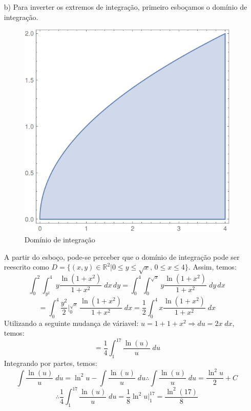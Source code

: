 \documentclass[12pt,a4paper]{article}
\begin{document}
\begin{itemize}
\item[b)] Para inverter os extremos de integração, primeiro esboçamos o domínio de integração.
\begin{figure}[H]
	\centering
	\includegraphics[scale=0.25]{Fig2b.png}  
	\caption{Domínio de integração}
	\label{fig:figura2bB}
\end{figure}
A partir do esboço, pode-se perceber que o domínio de integração pode ser reescrito como $D= \{(x,y)\in \mathbb{R}^2 | 0 \leq y \leq \sqrt{x}, \, 0 \leq x \leq 4\}$. Assim, temos:
$$ \int_0^2 \int_{y^2}^4 y \frac{\ln (1+x^2)}{1+x^2} \; dx \, dy = \int_0^4 \int_0^{\sqrt{x}} y \frac{\ln (1+x^2)}{1+x^2} \; dy \, dx  $$
$$ = \int_0^4  \frac{y^2}{2} \Big|_0^{\sqrt{x}} \, \frac{\ln (1+x^2)}{1+x^2} \; dx = \frac{1}{2} \int_0^4 x \frac{\ln (1+x^2)}{1+x^2} \; dx $$
Utilizando a seguinte mudança de váriavel: $u = 1 + 1+x^2 \Rightarrow du = 2 x \; dx $, temos:
$$ =  \frac{1}{4} \int_1^{17} \frac{\ln (u)}{u} \; du $$
Integrando por partes, temos:
$$ \int \frac{\ln (u)}{u} \; du = \ln^2 u - \int \frac{\ln (u)}{u} \; du \therefore \int \frac{\ln (u)}{u} \; du = \frac{\ln^2 u}{2} + C $$
$$ \therefore \frac{1}{4} \int_1^{17} \frac{\ln (u)}{u} \; du = \frac{1}{8} \ln^2 u \Big|_1^{17} = \frac{\ln^2(17)}{8} $$

\end{itemize}
\end{document}

